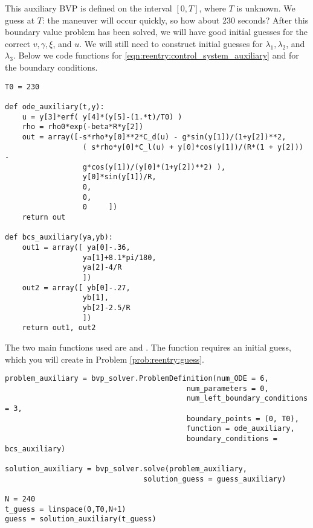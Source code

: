 This auxiliary BVP is defined on the interval $[0,T]$, where $T$ is unknown.
We guess at $T$: the maneuver will occur quickly, so how about 230 seconds?  After this boundary value problem has been solved, we will have good initial guesses for the correct $v,\gamma,\xi$, and $u.$ We will still need to construct initial guesses for $\lambda_1, \lambda_2$, and $\lambda_3$.
Below we code  functions for \eqref{eqn:reentry:control_system_auxiliary} and for the boundary conditions.
\begin{lstlisting}
T0 = 230

def ode_auxiliary(t,y):
	u = y[3]*erf( y[4]*(y[5]-(1.*t)/T0) )
	rho = rho0*exp(-beta*R*y[2])
	out = array([-s*rho*y[0]**2*C_d(u) - g*sin(y[1])/(1+y[2])**2,
				  ( s*rho*y[0]*C_l(u) + y[0]*cos(y[1])/(R*(1 + y[2])) -
				  g*cos(y[1])/(y[0]*(1+y[2])**2) ),
				  y[0]*sin(y[1])/R,
				  0,
				  0,
				  0		])
	return out

def bcs_auxiliary(ya,yb):
	out1 = array([ ya[0]-.36,
				  ya[1]+8.1*pi/180,
				  ya[2]-4/R
				  ])
	out2 = array([ yb[0]-.27,
				  yb[1],
				  yb[2]-2.5/R
				  ])
	return out1, out2
\end{lstlisting}

The two main functions used are  and .
The function  requires an initial guess, which you will create in Problem \ref{prob:reentry:guess}.

%
%
%
%
%

\begin{lstlisting}
problem_auxiliary = bvp_solver.ProblemDefinition(num_ODE = 6,
										  num_parameters = 0,
										  num_left_boundary_conditions = 3,
										  boundary_points = (0, T0),
										  function = ode_auxiliary,
										  boundary_conditions = bcs_auxiliary)

solution_auxiliary = bvp_solver.solve(problem_auxiliary,
								solution_guess = guess_auxiliary)

N = 240
t_guess = linspace(0,T0,N+1)
guess = solution_auxiliary(t_guess)
\end{lstlisting}







